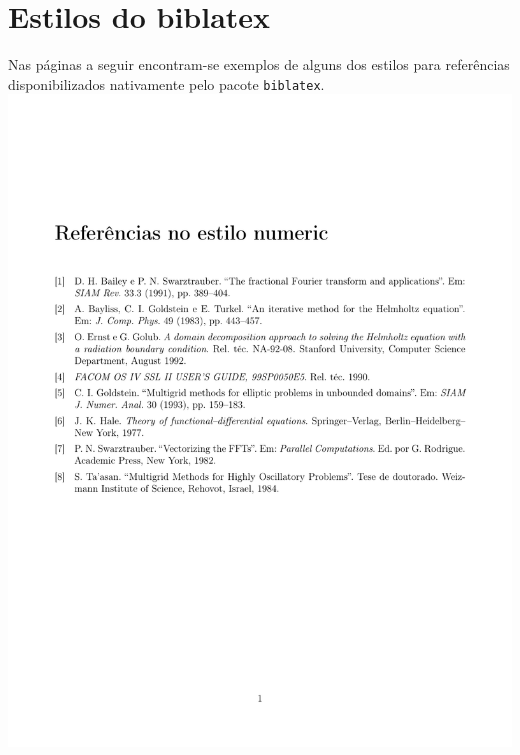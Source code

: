 \chapter{Estilos do biblatex} \label{ape:estilo_biblatex}
Nas páginas a seguir encontram-se exemplos de alguns dos estilos para
referências disponibilizados nativamente pelo pacote \lstinline+biblatex+.
\newpage
\includegraphics[width=1\textwidth]{biblatex_style_samples/numeric} \\
